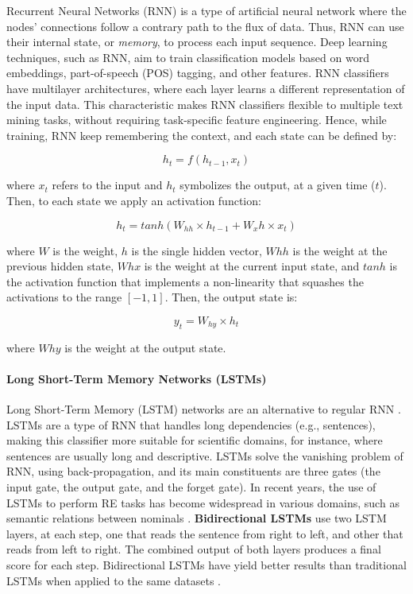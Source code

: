 Recurrent Neural Networks (RNN) is a type of artificial neural network where the nodes' connections follow a contrary path to the flux of data. Thus, RNN can use their internal state, or \textit{memory}, to process each input sequence. 
Deep learning techniques, such as RNN, aim to train classification models based on word embeddings, part-of-speech (POS) tagging, and other features. RNN classifiers have multilayer architectures, where each layer learns a different representation of the input data. This characteristic makes RNN classifiers flexible to multiple text mining tasks, without requiring task-specific feature engineering. Hence, while training, RNN keep remembering the context, and each state can be defined by:

\begin{equation}
    h_t = f(h_{t-1}, x_t)
\end{equation}

where $x_t$ refers to the input and $h_t$ symbolizes the output, at a given time ($t$). Then, to each state we apply an activation function:

\begin{equation}
    h_t = tanh(W_{hh} \times h_{t-1} + W_xh \times x_t)
\end{equation}

where $W$ is the weight, $h$ is the single hidden vector, $Whh$ is the weight at the previous hidden state, $Whx$ is the weight at the current input state, and $tanh$ is the activation function that implements a non-linearity that squashes the activations to the range $[-1,1]$. Then, the output state is:

\begin{equation}
    y_t = W_{hy} \times h_{t}
\end{equation}

where $Why$ is the weight at the output state.

\paragraph{Long Short-Term Memory Networks (LSTMs)}

Long Short-Term Memory (LSTM) networks are an alternative to regular RNN \citep{hochreiter1997long}. LSTMs are a type of RNN that handles long dependencies (e.g., sentences), making this classifier more suitable for scientific domains, for instance, where sentences are usually long and descriptive. LSTMs solve the vanishing problem of RNN, using back-propagation, and its main constituents are three gates (the input gate, the output gate, and the forget gate).
In recent years, the use of LSTMs to perform RE tasks has become widespread in various domains, such as semantic relations between nominals \citep{miwa2016end}. \textbf{Bidirectional LSTMs} use two LSTM layers, at each step, one that reads the sentence from right to left, and other that reads from left to right. The combined output of both layers produces a final score for each step. Bidirectional LSTMs have yield better results than traditional LSTMs when applied to the same datasets \citep{zhang2015bidirectional}.

